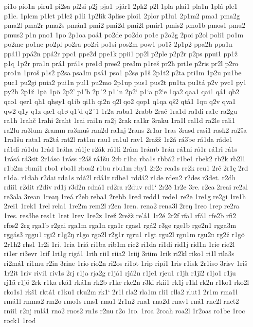 pi1o
pio1n
piru1
pi2sa
pi2si
p2j
pja1
pjár1
2pk2
p2l
1pla
plai1
pla1n
1plá
ple1
p1le.
1plem
p1let
p1lež
p1li
1p2lik
3plise
ploi1
2plor
p1lu1
2p1m2
pma1
pma2g
pma2l
pma2r
pma2s
pmán1
pmi2
pmi2d
pmi2l
pmir1
pmis2
pmo1b
pmos1
pmu2
pmus2
p1n
pno1
1po
2p1oa
poá1
po2de
po2do
po1e
p2o2g
2poi
p2ol
poli1
po1m
po2me
po1ne
po2pl
po2ra
po2ri
po1si
pos2m
pow1
po1ž
2p1p2
ppa2h
ppa1n
ppá1l
ppá2n
ppá2r
ppc1
ppe2d
ppe1k
ppii1
pp2l
p2ple
p2p2r
p2ps
ppui1
pp1ž
p1q
1p2r
pra1n
prá1
prá1s
pre1d
pree2
pre3m
p1reš
pr2h
pri1e
p2ris
pr2l
p2ro
pro1n
1proš
p1s2
p2sa
psa1m
psá1
pso1
p2sø
p1š
2p1t2
p2ta
pti1m
1p2u
pu1be
puc1
pu2gi
puia2
pui1n
pul1
pu2mo
2p1up
pus1
pus2t
pu1ta
pu1tá
p2v
pvc1
py1
py2h
2p1ž
1pä
1pö
2p2'
p1'b
2p´2
p1´n
2p2`
p1`a
p2`e
1qa2
qaa1
qai1
qá1
qb2
qco1
qer1
qh1
qhøy1
q1ib
qi1h
qi2n
q2l
qo2
qop1
q1qa
qš2
qtå1
1qu
q2v
qva1
qw2
q1y
q1z
qæ1
q1ø
q1'd
q2´1
1r2a
raba1
2rabb
2rač
1ra1d
ra1di
ra1e
ra2gu
ra1h
1rahč
1rahi
2raht
1rai
rai1n
ra2j
2rak
ra1kr
3raku
1ra1l
ral1d
ra2le
rali1
ra2lu
ra3lum
2ramm
ra3muš
ran2d
ra1nj
2rans
2r1ar
1ras
3rasd
rasi1
rask2
ra2ša
1ra1šu
rata1
ra2tá
rat2l
rat1m
rau1
ra1ul
rav1
2ražž
1r2á
rá3be
rá1da
ráde1
rá1di
rá1du
1ráđ
1ráha
rá1je
r2ák
rá1li
2rám
1rámb
1rán
rá1ni
rá1r
rá1ri
rá1s
1rásá
rá3sit
2r1áso
1ráss
r2áš
rá1šu
2rb
r1ba
rba1s
rbbá2
r1be1
rbek2
rb2k
rb2l1
r1b2m
rbmi1
rbo1
rbo1l
rbos2
r1bu
rbu1m
rby1
2r2c
rca1s
rc2k
rcu1
2rč
2r1ç
2rd
r1da.
r1dab
r2dai
rda1s
rdá2l
rdá1r
rdbe1
rddá2
r1de
rden2
r2des
r3det.
r2dh
rdii1
r2dit
r2div
rd1j
r3d2n
rdná1
rd2ra
r2duv
rd1`
2r2ð
1r2e
3re.
r2ea
2reai
re2al
re3ala
3rean
1reaŋ
1reá
r2eb
reba1
2rebb
1red
redd1
rede1
re2e
1re1g
re2gi
1re1h
2rei1
1rek1
1rel
rela1
1re2m
rem2l
r2en
1ren.
rena2
rena3l
2reŋ
1reo
1rep
re2ra
1res.
res3he
res1t
1ret
1rev
1re2z
1rež
2režž
re'á1
1r2é
2r2f
rfa1
rfá1
rfe2b
rfi2
rfos2
2rg
rga1b
r2gai
rga1m
rga1n
rga1r
rgas1
rgá2
r3ge
rge1b
rge2n1
rgga3m
rggás3
rggu1
rgi2
r1g2ŋ
r1go
rgo2l
r2g1r
rgru1
r1gt
rgu2l
rgu1m
rgu2n
rg2ž
r1gö
2r1h2
rhs1
1r2i
1ri.
1ria
1riá
ri1ba
rib1m
ric2
ri1da
ri1di
rid1j
rid1n
1rie
rie2l
ri1er
ri3evr
1rif
1ri1g
rigá1
1rih
rii1
riia2
1riij
3riim
1rik
ri2kl
riko1
ri1l
rila3s
ri2má1
ri1mu
r2in
3rine
1rio
rio2n
ri2os
ri1ot
1rip
ripi1
1ris
r1isk
2r1iso
3risv
1riš
1r2it
1riv
rivi1
riv1s
2rj
r1ja
rja2g
r1já1
rjá2n
r1je1
rjeu1
r1jh
r1ji2
r1jo1
r1ju
rj1ä
r1jö
2rk
r1ka
rká1
rká1n
rk2b
r1ke
rke2n
r3ki
rkii1
rk1j
r1kl
rk2n
r1ko1
rko2l
rko1s1
rkš1
rktá1
r1ku1
rku2m
rk1`
2r1l
rla2
rla1m
rli1
rlla2
rlut1
2r1m
rma1l
rmá1l
rmma2
rm2o
rmo1s
rms1
rmu1
2r1n2
rna1
rna2d
rnav1
rná1
rne2l
rnet2
rnii1
r2nj
rnlá1
rno2
rnos2
rn1s
r2nu
r2o
1ro.
1roa
2roah
roa2l
1r2oas
ro1be
1roc
rock1
1rod
